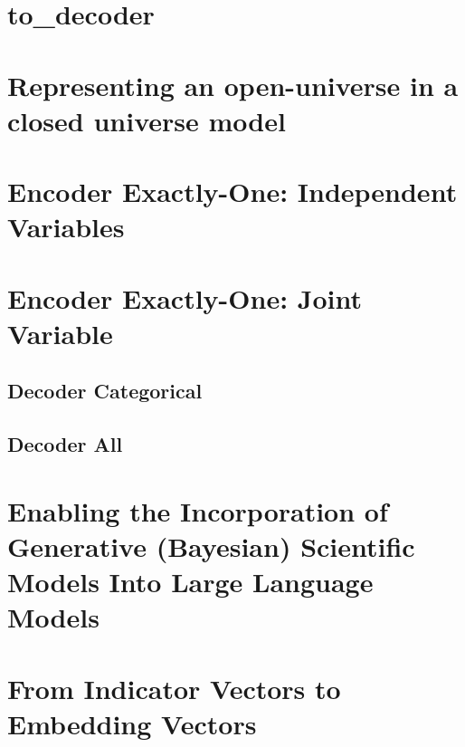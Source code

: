 \section{to_decoder} %


\section{Representing an open-universe in a closed universe model} %


\section{Encoder Exactly-One: Independent Variables} %


\section{Encoder Exactly-One: Joint Variable} %

\subsection{Decoder Categorical} %

\subsection{Decoder All} %



\section{Enabling the Incorporation of Generative (Bayesian) Scientific Models Into Large Language Models}

\section{From Indicator Vectors to Embedding Vectors} %